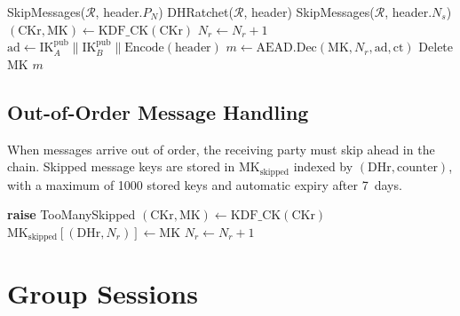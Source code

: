 \documentclass[11pt,a4paper]{article}
\begin{document}
\begin{algorithm}[H]
\caption{Decrypt Message}
\label{alg:decrypt}
\begin{algorithmic}[1]
        \State SkipMessages($\mathcal{R}$, header.$P_N$)
        \State DHRatchet($\mathcal{R}$, header)
    \EndIf
    \State SkipMessages($\mathcal{R}$, header.$N_s$)
    \State $(\mathrm{CKr}, \mathrm{MK}) \gets
        \mathrm{KDF\_CK}(\mathrm{CKr})$
    \State $N_r \gets N_r + 1$
    \State $\mathrm{ad} \gets \mathrm{IK}_A^{\mathrm{pub}} \|
        \mathrm{IK}_B^{\mathrm{pub}} \|
        \mathrm{Encode}(\mathrm{header})$
    \State $m \gets \mathrm{AEAD.Dec}(\mathrm{MK}, N_r,
        \mathrm{ad}, \mathrm{ct})$
    \State Delete MK
    \State \Return $m$
\EndFunction
\end{algorithmic}
\end{algorithm}

\subsection{Out-of-Order Message Handling}

When messages arrive out of order, the receiving party must skip ahead in
the chain.  Skipped message keys are stored in
$\mathrm{MK}_{\mathrm{skipped}}$ indexed by
$(\mathrm{DHr}, \mathrm{counter})$, with a maximum of 1000 stored keys
and automatic expiry after 7~days.

\begin{algorithm}[H]
\caption{Skip Messages}
\label{alg:skip}
\begin{algorithmic}[1]
        \State \textbf{raise} TooManySkipped
    \EndIf
        \State $(\mathrm{CKr}, \mathrm{MK}) \gets
            \mathrm{KDF\_CK}(\mathrm{CKr})$
        \State $\mathrm{MK}_{\mathrm{skipped}}[(\mathrm{DHr}, N_r)]
            \gets \mathrm{MK}$
        \State $N_r \gets N_r + 1$
    \EndWhile
\EndProcedure
\end{algorithmic}
\end{algorithm}

\section{Group Sessions}
\label{sec:group}
\end{document}
